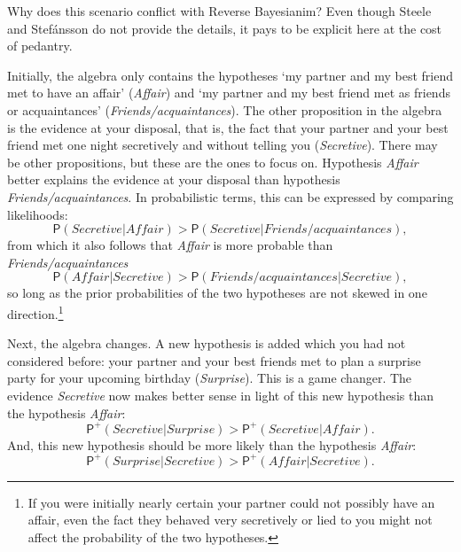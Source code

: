 \documentclass[
  11pt,
  dvipsnames,enabledeprecatedfontcommands]{scrartcl}
\newcommand{\pr}[1]{\ensuremath{\mathsf{P}(#1)}}
\newcommand{\ppr}[2]{\ensuremath{\mathsf{P}^{#1}(#2)}}
\begin{document}
\noindent Why does this scenario conflict with Reverse Bayesianim? Even
though Steele and Stefánsson do not provide the details, it pays to be
explicit here at the cost of pedantry.

Initially, the algebra only contains the hypotheses `my partner and my
best friend met to have an affair' (\textit{Affair}) and `my partner and
my best friend met as friends or acquaintances'
(\textit{Friends/acquaintances}). The other proposition in the algebra
is the evidence at your disposal, that is, the fact that your partner
and your best friend met one night secretively and without telling you
(\textit{Secretive}). There may be other propositions, but these are the
ones to focus on. Hypothesis \textit{Affair} better explains the
evidence at your disposal than hypothesis
\textit{Friends/acquaintances}. In probabilistic terms, this can be
expressed by comparing likelihoods:
\[\pr{ \textit{Secretive} \vert \textit{Affair}}> \pr{\textit{Secretive} \vert \textit{Friends/acquaintances}},\]
from which it also follows that \textit{Affair} is more probable than
\textit{Friends/acquaintances}
\[\pr{\textit{Affair} \vert  \textit{Secretive} }> \pr{\textit{Friends/acquaintances} \vert \textit{Secretive}}, \tag{>}\]
so long as the prior probabilities of the two hypotheses are not skewed
in one direction.\footnote{If you were initially nearly certain your
  partner could not possibly have an affair, even the fact they behaved
  very secretively or lied to you might not affect the probability of
  the two hypotheses.}

Next, the algebra changes. A new hypothesis is added which you had not
considered before: your partner and your best friends met to plan a
surprise party for your upcoming birthday (\textit{Surprise}). This is a
game changer. The evidence \textit{Secretive} now makes better sense in
light of this new hypothesis than the hypothesis \textit{Affair}:
\[\ppr{+}{ \textit{Secretive} \vert \textit{Surprise}}> \ppr{+}{\textit{Secretive} \vert \textit{Affair}}.\]
And, this new hypothesis should be more likely than the hypothesis
\textit{Affair}:
\[\ppr{+}{ \textit{Surprise} \vert \textit{Secretive}}> \ppr{+}{ \textit{Affair} \vert \textit{Secretive}}. \tag{*}\]
\end{document}

